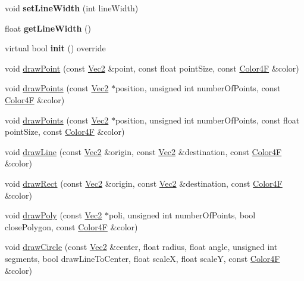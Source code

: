 \begin{DoxyCompactItemize}
\item 
\mbox{\label{classDrawNode_abe4bfc04c799afd7c86e1ded2be1860e}} 
void {\bfseries set\+Line\+Width} (int line\+Width)
\item 
\mbox{\label{classDrawNode_a017a52661990b0f71d7df51f87776204}} 
float {\bfseries get\+Line\+Width} ()
\item 
\mbox{\label{classDrawNode_a8a54e5d3ccf97fb731e937d22c85db02}} 
virtual bool {\bfseries init} () override
\item 
void \hyperlink{classDrawNode_ae95a0e497adf2884d571262e4725822e}{draw\+Point} (const \hyperlink{classVec2}{Vec2} \&point, const float point\+Size, const \hyperlink{structColor4F}{Color4F} \&color)
\item 
void \hyperlink{classDrawNode_a258b2a3fb7e094b1eebf17b0538e6dde}{draw\+Points} (const \hyperlink{classVec2}{Vec2} $\ast$position, unsigned int number\+Of\+Points, const \hyperlink{structColor4F}{Color4F} \&color)
\item 
void \hyperlink{classDrawNode_a0bd985652af62bea73a86155560ec313}{draw\+Points} (const \hyperlink{classVec2}{Vec2} $\ast$position, unsigned int number\+Of\+Points, const float point\+Size, const \hyperlink{structColor4F}{Color4F} \&color)
\item 
void \hyperlink{classDrawNode_a0e45a721e54084a78121171f3e752933}{draw\+Line} (const \hyperlink{classVec2}{Vec2} \&origin, const \hyperlink{classVec2}{Vec2} \&destination, const \hyperlink{structColor4F}{Color4F} \&color)
\item 
void \hyperlink{classDrawNode_ac4a2969bd4fb055c9212c37b0966e093}{draw\+Rect} (const \hyperlink{classVec2}{Vec2} \&origin, const \hyperlink{classVec2}{Vec2} \&destination, const \hyperlink{structColor4F}{Color4F} \&color)
\item 
void \hyperlink{classDrawNode_a099aa3372ad6fe9f135a166e1e071130}{draw\+Poly} (const \hyperlink{classVec2}{Vec2} $\ast$poli, unsigned int number\+Of\+Points, bool close\+Polygon, const \hyperlink{structColor4F}{Color4F} \&color)
\item 
void \hyperlink{classDrawNode_adf9a11257ee5e1e308792a8949e3093b}{draw\+Circle} (const \hyperlink{classVec2}{Vec2} \&center, float radius, float angle, unsigned int segments, bool draw\+Line\+To\+Center, float scaleX, float scaleY, const \hyperlink{structColor4F}{Color4F} \&color)
\item 

\end{DoxyCompactItemize}
